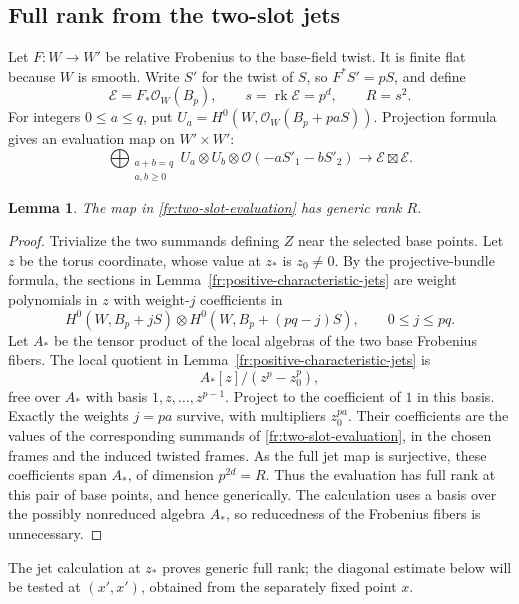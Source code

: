 \documentclass[12pt,a4paper,psamsfonts]{amsart}
\theoremstyle{definition}
\theoremstyle{plain}
\newtheorem{lemma}{Lemma}[section]
\newcommand{\OO}{\mathcal O}
\DeclareMathOperator{\rk}{rk}
\begin{document}
\subsection{Full rank from the two-slot jets}
\label{fr:full-rank}

Let $F:W\to W'$ be relative Frobenius to the base-field twist.
It is finite flat because $W$ is smooth.  Write $S'$ for the twist
of $S$, so $F^*S'=pS$, and define
\[
 \mathcal E=F_*\OO_W(B_p),\qquad s=\rk\mathcal E=p^d,
 \qquad R=s^2.
\]
For integers $0\le a\le q$, put
$U_a=H^0(W,\OO_W(B_p+paS))$.
Projection formula gives an evaluation map on $W'\times W'$:
\begin{equation}\label{fr:two-slot-evaluation}
 \bigoplus_{\substack{a+b=q\\a,b\ge0}}
 U_a\otimes U_b\otimes
 \OO(-aS'_1-bS'_2)
 \longrightarrow \mathcal E\boxtimes\mathcal E.
\end{equation}

\begin{lemma}\label{fr:generic-rank}
The map in \eqref{fr:two-slot-evaluation} has generic rank $R$.
\end{lemma}

\begin{proof}
Trivialize the two summands defining $Z$ near the selected base
points.  Let $z$ be the torus coordinate, whose value at $z_*$ is
$z_0\ne0$.  By the projective-bundle formula, the sections in
Lemma~\ref{fr:positive-characteristic-jets} are weight polynomials in $z$
with weight-$j$ coefficients in
\[
 H^0(W,B_p+jS)\otimes
 H^0(W,B_p+(pq-j)S),\qquad 0\le j\le pq.
\]
Let $A_*$ be the tensor product of the local algebras of the two
base Frobenius fibers.  The local quotient in
Lemma~\ref{fr:positive-characteristic-jets} is
\[
 A_*[z]/(z^p-z_0^p),
\]
free over $A_*$ with basis $1,z,\ldots,z^{p-1}$.  Project to the
coefficient of $1$ in this basis.  Exactly the weights $j=pa$
survive, with multipliers $z_0^{pa}$.  Their coefficients are the
values of the corresponding summands of
\eqref{fr:two-slot-evaluation}, in the chosen frames and the induced
twisted frames.  As the full jet map is surjective, these coefficients
span $A_*$, of dimension $p^{2d}=R$.  Thus the evaluation has full
rank at this pair of base points, and hence generically.  The
calculation uses a basis over the possibly nonreduced algebra $A_*$,
so reducedness of the Frobenius fibers is unnecessary.
\end{proof}

The jet calculation at $z_*$ proves generic full rank; the diagonal
estimate below will be tested at $(x',x')$, obtained from the
separately fixed point $x$.
\end{document}
